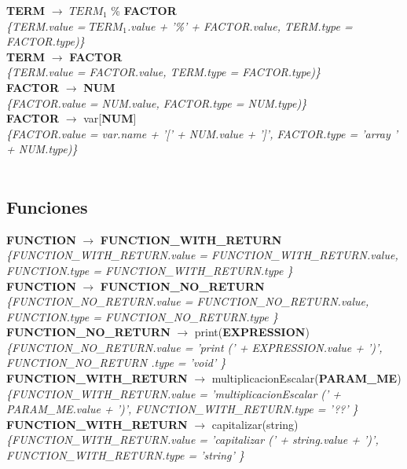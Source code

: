 \documentclass[10pt,a4paper]{article}
\begin{document}
\textbf{TERM} $\rightarrow$ \textbf{$TERM_{1}$} \% \textbf{FACTOR}  \\
\textit{\{TERM.value = $TERM_{1}$.value + '\%' + FACTOR.value, TERM.type = FACTOR.type)\}} \\

\textbf{TERM} $\rightarrow$ \textbf{FACTOR} \\
\textit{\{TERM.value = FACTOR.value, TERM.type = FACTOR.type)\}} \\

\textbf{FACTOR} $\rightarrow$ \textbf{NUM}   \\
\textit{\{FACTOR.value = NUM.value, FACTOR.type = NUM.type)\}} \\

\textbf{FACTOR} $\rightarrow$ var[\textbf{NUM}]  \\ 
\textit{\{FACTOR.value = var.name + '[' + NUM.value + ']', FACTOR.type = 'array ' + NUM.type)\}}  \\ 
\\

\subsection{Funciones}
\textbf{FUNCTION} $\rightarrow$ \textbf{FUNCTION\_WITH\_RETURN} \\
\textit{\{FUNCTION\_WITH\_RETURN.value =  FUNCTION\_WITH\_RETURN.value, FUNCTION.type = FUNCTION\_WITH\_RETURN.type \}} \\

\textbf{FUNCTION} $\rightarrow$ \textbf{FUNCTION\_NO\_RETURN} \\
\textit{\{FUNCTION\_NO\_RETURN.value =  FUNCTION\_NO\_RETURN.value, FUNCTION.type = FUNCTION\_NO\_RETURN.type \}} \\

\textbf{FUNCTION\_NO\_RETURN} $\rightarrow$ print(\textbf{EXPRESSION}) \\   
\textit{\{FUNCTION\_NO\_RETURN.value =  'print (' + EXPRESSION.value + ')', FUNCTION\_NO\_RETURN .type = 'void' \}} \\

\textbf{FUNCTION\_WITH\_RETURN} $\rightarrow$ multiplicacionEscalar(\textbf{PARAM\_ME}) \\ 
\textit{\{FUNCTION\_WITH\_RETURN.value =  'multiplicacionEscalar (' + PARAM\_ME.value + ')', FUNCTION\_WITH\_RETURN.type = '??' \}} \\

\textbf{FUNCTION\_WITH\_RETURN} $\rightarrow$ capitalizar(string)   \\
\textit{\{FUNCTION\_WITH\_RETURN.value =  'capitalizar (' + string.value + ')', FUNCTION\_WITH\_RETURN.type = 'string' \}} \\
\end{document}
